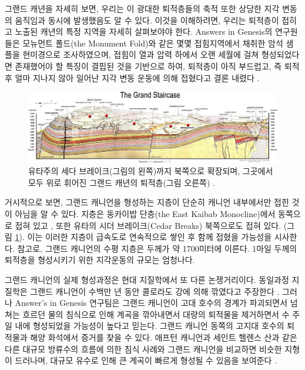 \documentclass[10pt,twocolumn,letterpaper]{article}
\begin{document}
그랜드 캐년을 자세히 보면, 우리는 이 광대한 퇴적층들의 축적 또한  상당한 지각 변동의 움직임과 동시에 발생했음도 알 수 있다. 이것을 이해하려면, 우리는 퇴적층이 접히고 노출된 캐년의 특정 지역을 자세히 살펴보야야 한다.  Answers in Genesis의 연구원들은 \cite{42} 모뉴먼트 폴드(the Monument Fold)와 같은 몇몇 접힘지역에서 채취한 암석 샘플을 현미경으로 조사하였으며, 접힘이 열과 압력 하에서 오랜 세월에 걸쳐 형성되었다면 존재했어야 할 특징이 결핍된 것을 기반으로 하여, 퇴적층이 아직 부드럽고, 즉 퇴적 후 얼마 지나지 않아 일어난 지각 변동 운동에 의해 접혔다고 결론 내렸다 \cite{43}.

\begin{figure}
\begin{center}
\includegraphics[width=1\textwidth]{Grand_Staircase-big.jpg}
\end{center}
   \caption{ 유타주의 세다 브레이크(그림의 왼쪽)까지 북쪽으로 확장되며, 그곳에서 모두 위로 휘어진 그랜드 캐년의 퇴적층(그림 오른쪽) \cite{50}.}
\label{fig:4}
\end{figure}

거시적으로 보면, 그랜드 캐니언을 형성하는 지층이 단순히 캐니언 내부에서만 접힌 것이 아님을 알 수 있다. 지층은 동카이밥 단층(the East Kaibab Monocline)에서 동쪽으로 접혀 있고 \cite{46}, 또한 유타의 시더 브레이크(Cedar Breaks) 북쪽으로도 접혀 있다. (그림 \ref{fig:4}). 이는 이러한 지층이 급속도로 연속적으로 쌓인 후 함께 접혔을 가능성을 시사한다. 참고로, 그랜드 캐니언의 수평 지층은 두께가 약 1700미터에 이른다. 1마일 두께의 퇴적층을 형성시키기 위한 지각운동의 규모는 엄청나다.

그랜드 캐니언의 실제 형성과정은 현대 지질학에서 또 다른 논쟁거리이다. 동일과정 지질학은 그랜드 캐니언이 수백만 년 동안 콜로라도 강에 의해 깎였다고 주장한다 \cite{47}. 그러나 Answer's in Genesis 연구팀은 그랜드 캐니언이 고대 호수의 경계가 파괴되면서 넘쳐는 흐르던 물의 침식으로 인해 계곡을 깎아내면서 대량의 퇴적물을 제거하면서 수 주일 내에 형성되었을 가능성이 높다고 믿는다. 그랜드 캐니언 동쪽의 고지대 호수의 퇴적물과 해양 화석에서 증거를 찾을 수 있다. 애프턴 캐니언과 세인트 헬렌스 산과 같은 다른 대규모 방류수의 흐름에 의한 침식 사례와 그랜드 캐니언을 비교하면 비슷한 지형이 드러나며, 대규모 유수로 인해 큰 계곡이 빠르게 형성될 수 있음을 보여준다 \cite{48}.
\end{document}
